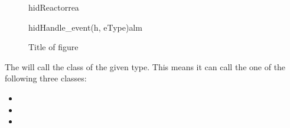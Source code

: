 \documentclass[Main]{subfiles}
\begin{document}
\begin{figure}
\begin {sequencediagram}

	\begin{call}{hid}{Reactor}{rea}{}
	\end{call}
	\begin{messcall}{hid}{Handle\_event(h, eType)}{alm}
	\end{messcall}



\end{sequencediagram}

\caption{Title of figure}
\label{fig:alarmEventHandler}
\end{figure}



The  will call the class of the given type.
This means it can call the one of the following three classes:
\begin{itemize}
	\item {}
	\item {}
	\item {}
\end{itemize}

\newpage
\end{document}
